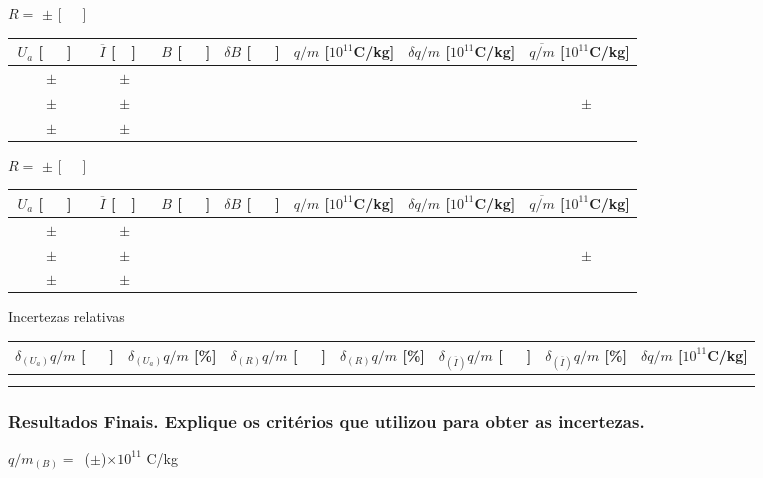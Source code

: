 \documentclass[a4paper,12pt]{article}  %
\begin{document}
\begin{center}
 \noindent	$R =$ \underline{\makebox[1.5cm][r]{~}}  $\pm$  	\underline{\makebox[1cm][r]{~}}  [~~~]
	\begin{tabular}{|c|c|c|c|c|c|c|}  
	\hline %
	  $U_a$ [~~~] & $\overline{I}$ [~~] &  $B$ [~~~] & $\delta B$  [~~~] & $q/m$ [$10^{11}$C/kg] & $\delta q/m$ [$10^{11}$C/kg] & $\overline{q/m}$ [$10^{11}$C/kg]\\ \hline 
	 $\qquad \pm \quad$ &$\qquad \pm \quad$&&&&& \\ \cline{2-6}
	 $\qquad \pm \quad$ &$\qquad \pm \quad$&&&&& $\qquad \pm \quad$ \\ \cline{2-6}
	 $\qquad \pm \quad$ &$\qquad \pm \quad$&&&&& \\
	 \hline 
	\end{tabular}

\noindent	$R =$ \underline{\makebox[1.5cm][r]{~}}  $\pm$  	\underline{\makebox[1cm][r]{~}}  [~~~]
	\begin{tabular}{|c|c|c|c|c|c|c|}  
	\hline %
	  $U_a$ [~~~] & $\overline{I}$ [~~] &  $B$ [~~~] & $\delta B$  [~~~] & $q/m$ [$10^{11}$C/kg] & $\delta q/m$ [$10^{11}$C/kg] & $\overline{q/m}$ [$10^{11}$C/kg]\\ \hline 
	 $\qquad \pm \quad$ &$\qquad \pm \quad$&&&&& \\ \cline{2-6}
	 $\qquad \pm \quad$ &$\qquad \pm \quad$&&&&& $\qquad \pm \quad$ \\ \cline{2-6}
	 $\qquad \pm \quad$ &$\qquad \pm \quad$&&&&& \\
	 \hline 
	\end{tabular}
\end{center}

Incertezas relativas

	\begin{small}
	\begin{tabular}{|c|c|c|c|c|c|c|}  
	\hline %
	  $\delta_{(U_a)}  q/m$ [~~~] &  $ \delta_{(U_a)} q/m$ [\%] & $\delta_{(R)}  q/m$ [~~~] & $\delta_{(R)}  q/m$ [\%] & 
	  $\delta_{(\overline{I})}  q/m $ [~~~] & $\delta_{(\overline{I})}  q/m $ [\%] & $\delta  q/m$ [$10^{11}$C/kg]\\ \hline 
	 &&&&&& \\ 
	 &&&&&& \\ \hline
	\end{tabular}
	 \end{small}

\subsubsection{\sf Resultados Finais. Explique os critérios que utilizou para obter as incertezas.}
\noindent  $q/m_{(B)} =$~(\underline{\makebox[1.5cm][r]{~}}$\pm$\underline{\makebox[1cm][r]{~}})$\times 10^{11}\,\,$C/kg  \\  
\end{document}
